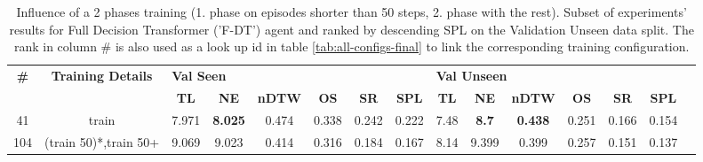 \begin{table}
\centering
\caption{\label{tab:f_dt_split_training_50}Influence of a 2 phases training (1. phase on episodes shorter than 50 steps, 2. phase with the rest). Subset of experiments' results for Full Decision Transformer ('F-DT') agent and ranked by descending SPL on the Validation Unseen data split. The rank in column \# is also used as a look up id in table \ref{tab:all-configs-final} to link the corresponding training configuration.}
\begin{tabular}{@{\hskip3pt}c@{\hskip3pt}c@{\hskip3pt}c@{\hskip3pt}c@{\hskip3pt}c@{\hskip3pt}c@{\hskip3pt}c@{\hskip3pt}c@{\hskip3pt}c@{\hskip3pt}c@{\hskip3pt}c@{\hskip3pt}c@{\hskip3pt}c@{\hskip3pt}c@{\hskip3pt}c}
\toprule
\textbf{\#} & \textbf{Training Details} & \multicolumn{6}{l}{\textbf{Val Seen}} & \multicolumn{6}{l}{\textbf{Val Unseen}} \\
 \textbf{~} &                \textbf{~} &       \textbf{TL} &     \textbf{NE} & \textbf{nDTW} & \textbf{OS} & \textbf{SR} & \textbf{SPL} &         \textbf{TL} &   \textbf{NE} &   \textbf{nDTW} & \textbf{OS} & \textbf{SR} & \textbf{SPL} \\
\midrule
         41 &                     train &             7.971 &  \textbf{8.025} &         0.474 &       0.338 &       0.242 &        0.222 &                7.48 &  \textbf{8.7} &  \textbf{0.438} &       0.251 &       0.166 &        0.154 \\
        104 &     (train 50)*,train 50+ &             9.069 &           9.023 &         0.414 &       0.316 &       0.184 &        0.167 &                8.14 &         9.399 &           0.399 &       0.257 &       0.151 &        0.137 \\
\bottomrule
\end{tabular}
\end{table}
